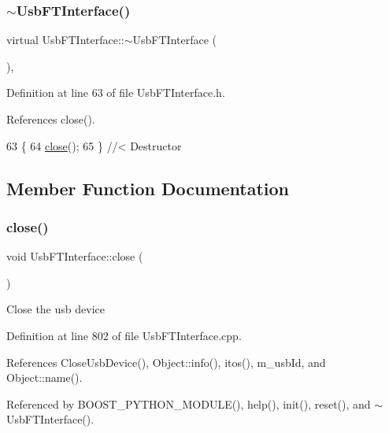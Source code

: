 \subsubsection{\texorpdfstring{$\sim$\+Usb\+F\+T\+Interface()}{~UsbFTInterface()}}
{\footnotesize\ttfamily virtual Usb\+F\+T\+Interface\+::$\sim$\+Usb\+F\+T\+Interface (\begin{DoxyParamCaption}{ }\end{DoxyParamCaption})\hspace{0.3cm}{\ttfamily [inline]}, {\ttfamily [virtual]}}



Definition at line 63 of file Usb\+F\+T\+Interface.\+h.



References close().


\begin{DoxyCode}
63                             \{
64     \hyperlink{classUsbFTInterface_ad555e20eb4b80da1d3cac5a8c6509bb5}{close}();
65   \} \textcolor{comment}{//< Destructor}
\end{DoxyCode}


\subsection{Member Function Documentation}
\mbox{\label{classUsbFTInterface_ad555e20eb4b80da1d3cac5a8c6509bb5}} 
\subsubsection{\texorpdfstring{close()}{close()}}
{\footnotesize\ttfamily void Usb\+F\+T\+Interface\+::close (\begin{DoxyParamCaption}{ }\end{DoxyParamCaption})}

Close the usb device 

Definition at line 802 of file Usb\+F\+T\+Interface.\+cpp.



References Close\+Usb\+Device(), Object\+::info(), itos(), m\+\_\+usb\+Id, and Object\+::name().



Referenced by B\+O\+O\+S\+T\+\_\+\+P\+Y\+T\+H\+O\+N\+\_\+\+M\+O\+D\+U\+L\+E(), help(), init(), reset(), and $\sim$\+Usb\+F\+T\+Interface().



